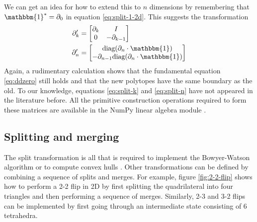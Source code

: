 \documentclass[twocolumn]{article}
\begin{document}
We can get an idea for how to extend this to $n$ dimensions by remembering that $\mathbbm{1}^* = \partial_0$ in equation \eqref{eq:split-1-2d}.
This suggests the transformation
\begin{align}
    \partial_k' & = \left[\begin{matrix}\partial_k & I \\ 0 & -\partial_{k - 1}\end{matrix}\right] \label{eq:split-k} \\
    \partial_n' & = \left[\begin{matrix}\text{diag}(\partial_n\cdot\mathbbm{1}) \\ -\partial_{n - 1}\text{diag}(\partial_n\cdot\mathbbm{1})\end{matrix}\right] \label{eq:split-n}
\end{align}
Again, a rudimentary calculation shows that the fundamental equation \eqref{eq:ddzero} still holds and that the new polytopes have the same boundary as the old.
To our knowledge, equations \eqref{eq:split-k} and \eqref{eq:split-n} have not appeared in the literature before.
All the primitive construction operations required to form these matrices are available in the NumPy linear algebra module \cite{harris2020array}.

\subsection{Splitting and merging}

The split transformation is all that is required to implement the Bowyer-Watson algorithm \cite{bowyer1981computing, watson1981computing} or to compute convex hulls \cite{berg1997computational}.
Other transformations can be defined by combining a sequence of splits and merges.
For example, figure \ref{fig:2-2-flip} shows how to perform a 2-2 flip in 2D by first splitting the quadrilateral into four triangles and then performing a sequence of merges.
Similarly, 2-3 and 3-2 flips can be implemented by first going through an intermediate state consisting of 6 tetrahedra.
\end{document}
